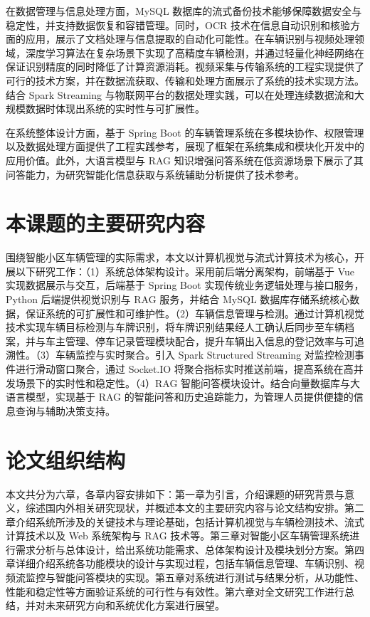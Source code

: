 \documentclass{wzuthesis} %
\begin{document}
在数据管理与信息处理方面，MySQL 数据库的流式备份技术能够保障数据安全与稳定性，并支持数据恢复和容错管理。同时，OCR 技术在信息自动识别和核验方面的应用，展示了文档处理与信息提取的自动化可能性。在车辆识别与视频处理领域，深度学习算法在复杂场景下实现了高精度车辆检测，并通过轻量化神经网络在保证识别精度的同时降低了计算资源消耗。视频采集与传输系统的工程实现提供了可行的技术方案，并在数据流获取、传输和处理方面展示了系统的技术实现方法。结合 Spark Streaming 与物联网平台的数据处理实践，可以在处理连续数据流和大规模数据时体现出系统的实时性与可扩展性。

在系统整体设计方面，基于 Spring Boot 的车辆管理系统在多模块协作、权限管理以及数据处理方面提供了工程实践参考，展现了框架在系统集成和模块化开发中的应用价值。此外，大语言模型与 RAG 知识增强问答系统在低资源场景下展示了其问答能力，为研究智能化信息获取与系统辅助分析提供了技术参考。

\section{本课题的主要研究内容}

围绕智能小区车辆管理的实际需求，本文以计算机视觉与流式计算技术为核心，开展以下研究工作：（1）系统总体架构设计。采用前后端分离架构，前端基于 Vue 实现数据展示与交互，后端基于 Spring Boot 实现传统业务逻辑处理与接口服务，Python 后端提供视觉识别与 RAG 服务，并结合 MySQL 数据库存储系统核心数据，保证系统的可扩展性和可维护性。（2）车辆信息管理与检测。通过计算机视觉技术实现车辆目标检测与车牌识别，将车牌识别结果经人工确认后同步至车辆档案，并与车主管理、停车记录管理模块配合，提升车辆出入信息的登记效率与可追溯性。（3）车辆监控与实时聚合。引入 Spark Structured Streaming 对监控检测事件进行滑动窗口聚合，通过 Socket.IO 将聚合指标实时推送前端，提高系统在高并发场景下的实时性和稳定性。（4）RAG 智能问答模块设计。结合向量数据库与大语言模型，实现基于 RAG 的智能问答和历史追踪能力，为管理人员提供便捷的信息查询与辅助决策支持。

\section{论文组织结构}

本文共分为六章，各章内容安排如下：第一章为引言，介绍课题的研究背景与意义，综述国内外相关研究现状，并概述本文的主要研究内容与论文结构安排。第二章介绍系统所涉及的关键技术与理论基础，包括计算机视觉与车辆检测技术、流式计算技术以及 Web 系统架构与 RAG 技术等。第三章对智能小区车辆管理系统进行需求分析与总体设计，给出系统功能需求、总体架构设计及模块划分方案。第四章详细介绍系统各功能模块的设计与实现过程，包括车辆信息管理、车辆识别、视频流监控与智能问答模块的实现。第五章对系统进行测试与结果分析，从功能性、性能和稳定性等方面验证系统的可行性与有效性。第六章对全文研究工作进行总结，并对未来研究方向和系统优化方案进行展望。
\end{document}
